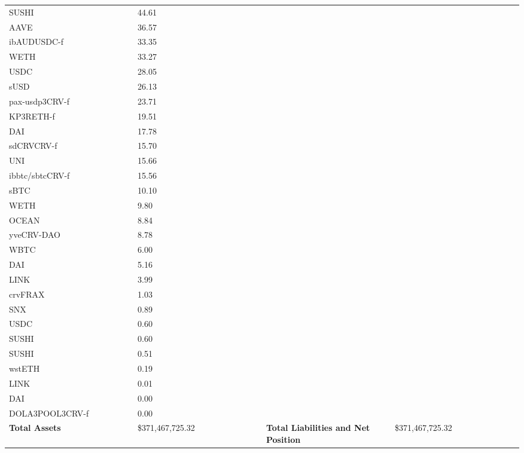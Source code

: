 \begin{longtable}{@{}p{0.25\linewidth}p{0.25\linewidth}p{0.25\linewidth}p{0.25\linewidth}@{}}
SUSHI & 44.61 & & \\
AAVE & 36.57 & & \\
ibAUDUSDC-f & 33.35 & & \\
WETH & 33.27 & & \\
USDC & 28.05 & & \\
sUSD & 26.13 & & \\
pax-usdp3CRV-f & 23.71 & & \\
KP3RETH-f & 19.51 & & \\
DAI & 17.78 & & \\
sdCRVCRV-f & 15.70 & & \\
UNI & 15.66 & & \\
ibbtc/sbtcCRV-f & 15.56 & & \\
sBTC & 10.10 & & \\
WETH & 9.80 & & \\
OCEAN & 8.84 & & \\
yveCRV-DAO & 8.78 & & \\
WBTC & 6.00 & & \\
DAI & 5.16 & & \\
LINK & 3.99 & & \\
crvFRAX & 1.03 & & \\
SNX & 0.89 & & \\
USDC & 0.60 & & \\
SUSHI & 0.60 & & \\
SUSHI & 0.51 & & \\
wstETH & 0.19 & & \\
LINK & 0.01 & & \\
DAI & 0.00 & & \\
DOLA3POOL3CRV-f & 0.00 & & \\

\midrule

\textbf{Total Assets} & \$371,467,725.32 & \textbf{Total Liabilities and Net Position} & \$371,467,725.32 \\

\bottomrule

\end{longtable}
